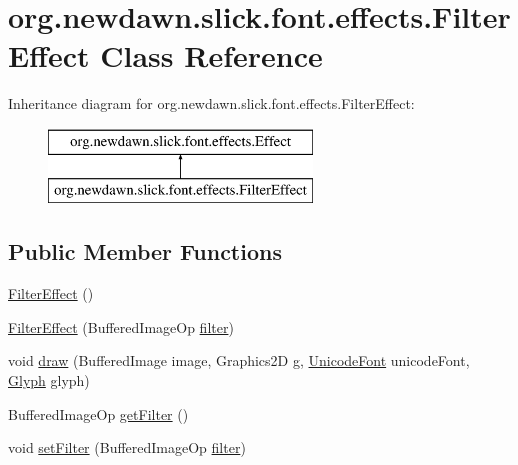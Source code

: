 \hypertarget{classorg_1_1newdawn_1_1slick_1_1font_1_1effects_1_1_filter_effect}{}\section{org.\+newdawn.\+slick.\+font.\+effects.\+Filter\+Effect Class Reference}
\label{classorg_1_1newdawn_1_1slick_1_1font_1_1effects_1_1_filter_effect}
Inheritance diagram for org.\+newdawn.\+slick.\+font.\+effects.\+Filter\+Effect\+:\begin{figure}[H]
\begin{center}
\leavevmode
\includegraphics[height=2.000000cm]{classorg_1_1newdawn_1_1slick_1_1font_1_1effects_1_1_filter_effect}
\end{center}
\end{figure}
\subsection*{Public Member Functions}
\begin{DoxyCompactItemize}
\item 
\mbox{\hyperlink{classorg_1_1newdawn_1_1slick_1_1font_1_1effects_1_1_filter_effect_a77ad8caac410c7adf82ebf8012f2b3dd}{Filter\+Effect}} ()
\item 
\mbox{\hyperlink{classorg_1_1newdawn_1_1slick_1_1font_1_1effects_1_1_filter_effect_a82a33ff77dd0c26d5418a7ce8a7c5791}{Filter\+Effect}} (Buffered\+Image\+Op \mbox{\hyperlink{classorg_1_1newdawn_1_1slick_1_1font_1_1effects_1_1_filter_effect_aafe0a98e55b983f1b26e5ed235d254be}{filter}})
\item 
void \mbox{\hyperlink{classorg_1_1newdawn_1_1slick_1_1font_1_1effects_1_1_filter_effect_a9c479e0b3f3217e26097c74d5db33f45}{draw}} (Buffered\+Image image, Graphics2D g, \mbox{\hyperlink{classorg_1_1newdawn_1_1slick_1_1_unicode_font}{Unicode\+Font}} unicode\+Font, \mbox{\hyperlink{classorg_1_1newdawn_1_1slick_1_1font_1_1_glyph}{Glyph}} glyph)
\item 
Buffered\+Image\+Op \mbox{\hyperlink{classorg_1_1newdawn_1_1slick_1_1font_1_1effects_1_1_filter_effect_a3f5536a3d0e247e784e6fd2a6af26c6a}{get\+Filter}} ()
\item 
void \mbox{\hyperlink{classorg_1_1newdawn_1_1slick_1_1font_1_1effects_1_1_filter_effect_a0ec0eb54fb67e32d69307f4823ee2edc}{set\+Filter}} (Buffered\+Image\+Op \mbox{\hyperlink{classorg_1_1newdawn_1_1slick_1_1font_1_1effects_1_1_filter_effect_aafe0a98e55b983f1b26e5ed235d254be}{filter}})
\end{DoxyCompactItemize}
